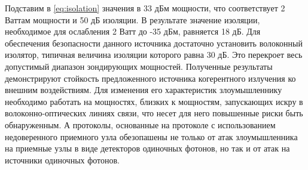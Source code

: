 Подставим в \ref{eq:isolation} значения в 33 дБм мощности, что соответствует 2 Ваттам мощности и 50 дБ изоляции. В результате значение изоляции, необходимое для ослабления 2 Ватт до -35 дБм, равняется 18 дБ. Для обеспечения безопасности данного источника достаточно установить волоконный изолятор, типичная величина изоляции которого равна 30 дБ. Это перекроет весь допустимый диапазон зондирующих мощностей. 
\newline Полученные результаты демонстрируют стойкость предложенного источника когерентного излучения ко внешним воздействиям. Для изменения его характеристик злоумышленнику необходимо работать на мощностях, близких к мощностям, запускающих искру в волоконно-оптических линиях связи, что несет для него повышенные риски быть обнаруженным. А протоколы, основанные на протоколе с использованием недоверенного приемного узла обезопашены не только от атак злоумышленника на приемные узлы в виде детекторов одиночных фотонов, но так и от атак на источники одиночных фотонов.
